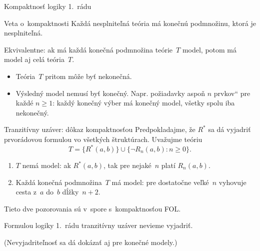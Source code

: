 \documentclass[12pt]{beamer}
\providecommand{\uv}[1]{\quotedblbase #1\textquotedblleft}
\begin{document}
\begin{frame}{Kompaktnosť logiky 1.~rádu}
  \begin{block}{Veta o~kompaktnosti}
    Každá nesplniteľná teória má konečnú podmnožinu, ktorá je nesplniteľná.
  \end{block}
  Ekvivalentne: ak má každá konečná podmnožina teórie~$T$ model,
  potom má model aj celá teória~$T$.
  \begin{itemize}
    \item Teória~$T$ pritom môže byť nekonečná.
    \item Výsledný model nemusí byť konečný. Napr. požiadavky \uv{aspoň $n$ prvkov} pre každé $n\ge1$:
  každý konečný výber má konečný model, všetky spolu iba nekonečný.
  \end{itemize}
\end{frame}

\begin{frame}{Tranzitívny uzáver: dôkaz kompaktnosťou}
  Predpokladajme, že $R^*$ sa dá vyjadriť prvorádovou formulou
  vo všetkých štruktúrach. Uvažujme teóriu
  \[
    T=\{R^*(a,b)\}\cup\{\lnot R_n(a,b):n\ge0\}.
  \]
  \begin{enumerate}
    \item $T$ nemá model: ak $R^*(a,b)$, tak pre nejaké~$n$ platí $R_n(a,b)$.
    \item Každá konečná podmnožina~$T$ má model:
      pre dostatočne veľké~$n$ vyhovuje cesta z~$a$ do~$b$ dĺžky~$n+2$.
  \end{enumerate}
  Tieto dve pozorovania sú v~spore s~kompaktnosťou FOL.

  \medskip
  \alert{Formulou logiky 1.~rádu tranzitívny uzáver nevieme vyjadriť.}

  \medskip
  (Nevyjadriteľnosť sa dá dokázať aj pre konečné modely.)
\end{frame}
\end{document}
